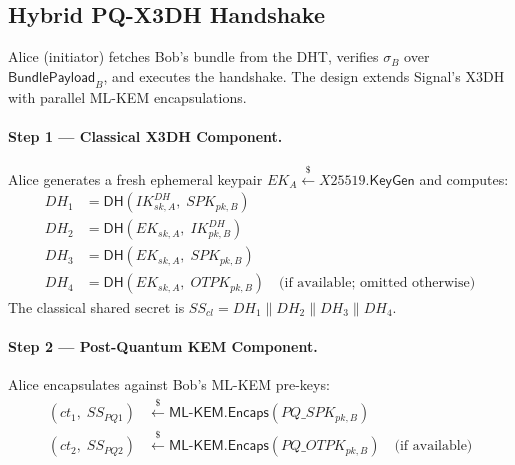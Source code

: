 \documentclass[11pt,a4paper]{article}
\theoremstyle{remark}
\theoremstyle{plain}
\newcommand{\getsr}{\stackrel{\$}{\leftarrow}}
\newcommand{\MLKEM}{\mathsf{ML\text{-}KEM}}
\newcommand{\DHop}{\mathsf{DH}}
\newcommand{\Encaps}{\mathsf{Encaps}}
\newcommand{\KeyGen}{\mathsf{KeyGen}}
\begin{document}
\subsection{Hybrid PQ-X3DH Handshake}
\label{sec:x3dh}

Alice (initiator) fetches Bob's bundle from the DHT, verifies $\sigma_B$
over $\mathsf{BundlePayload}_B$, and executes the handshake. The design extends Signal's
X3DH \cite{marlinspike_x3dh} with parallel ML-KEM encapsulations.

\paragraph{Step 1 --- Classical X3DH Component.}
Alice generates a fresh ephemeral keypair $EK_A \getsr X25519.\KeyGen$ and computes:
\begin{align*}
  DH_1 &= \DHop(IK^{DH}_{sk,A},\; SPK_{pk,B}) \\
  DH_2 &= \DHop(EK_{sk,A},\; IK^{DH}_{pk,B}) \\
  DH_3 &= \DHop(EK_{sk,A},\; SPK_{pk,B}) \\
  DH_4 &= \DHop(EK_{sk,A},\; OTPK_{pk,B}) \quad \text{(if available; omitted otherwise)}
\end{align*}
The classical shared secret is $SS_{cl} = DH_1 \| DH_2 \| DH_3 \| DH_4$.

\paragraph{Step 2 --- Post-Quantum KEM Component.}
Alice encapsulates against Bob's ML-KEM pre-keys:
\begin{align*}
  (ct_1,\; SS_{PQ1}) &\getsr \MLKEM.\Encaps(PQ\_SPK_{pk,B}) \\
  (ct_2,\; SS_{PQ2}) &\getsr \MLKEM.\Encaps(PQ\_OTPK_{pk,B}) \quad \text{(if available)}
\end{align*}
\end{document}
